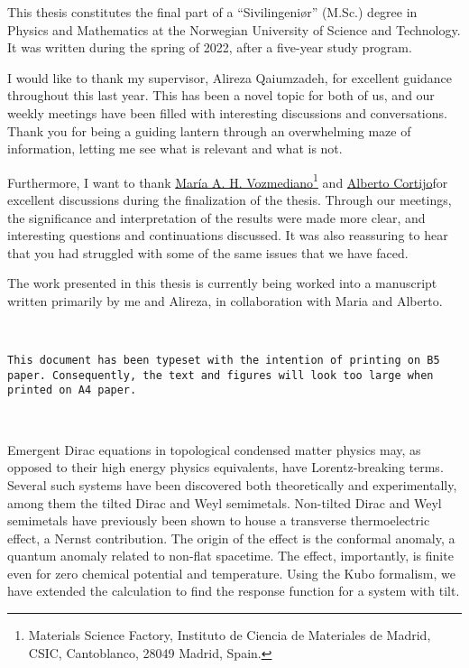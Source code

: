 This thesis constitutes the final part of a ``Sivilingeniør'' (M.Sc.) degree in Physics and Mathematics at the Norwegian University of Science and Technology.
It was written during the spring of 2022, after a five-year study program.

I would like to thank my supervisor, Alireza Qaiumzadeh, for excellent guidance throughout this last year.
This has been a novel topic for both of us, and our weekly meetings have been filled with interesting discussions and conversations.
Thank you for being a guiding lantern through an overwhelming maze of information, letting me see what is relevant and what is not.

Furthermore, I want to thank
\href{https://wp.icmm.csic.es/field-theories-in-condensed-matter-physics/vozmediano/}{María A. H. Vozmediano}\footnote{Materials Science Factory, Instituto de Ciencia de Materiales de Madrid, CSIC, Cantoblanco, 28049 Madrid, Spain\label{address-of-spain}.}
and
\href{https://wp.icmm.csic.es/field-theories-in-condensed-matter-physics/alberto-cortijo/}{Alberto Cortijo}\footnotemark[1]
for excellent discussions during the finalization of the thesis.
Through our meetings, the significance and interpretation of the results were made more clear, and interesting questions and continuations discussed.
It was also reassuring to hear that you had struggled with some of the same issues that we have faced.

The work presented in this thesis is currently being worked into a manuscript written primarily by me and Alireza, in collaboration with Maria and Alberto.


\vspace{3cm}
{
  \centering
  \color{black!80}
  \hrulefill\bigskip\\
  \parbox{0.84\textwidth}{
    \centering
  \texttt{This document has been typeset with the intention of printing on B5 paper. Consequently, the text and figures will look too large when printed on A4 paper.}
  }\\
  \bigskip\smallskip\hrulefill
}

Emergent Dirac equations in topological condensed matter physics may, as opposed to their high energy physics equivalents, have Lorentz-breaking terms.
Several such systems have been discovered both theoretically and experimentally, among them the tilted Dirac and Weyl semimetals.
Non-tilted Dirac and Weyl semimetals have previously been shown to house a transverse thermoelectric effect, a Nernst contribution.
The origin of the effect is the conformal anomaly, a quantum anomaly related to non-flat spacetime.
The effect, importantly, is finite even for zero chemical potential and temperature.
Using the Kubo formalism, we have extended the calculation to find the response function for a system with tilt.

